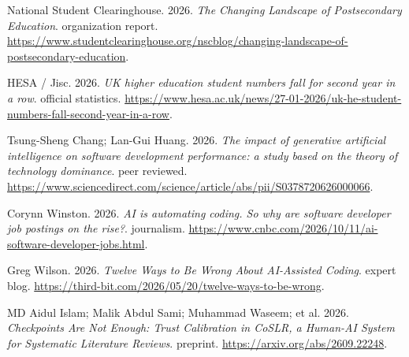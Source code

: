 {\begin{description}[leftmargin=2em,labelwidth=1.5em,itemsep=1pt,parsep=0pt]
\item[116.] \hypertarget{ref-nscc2026}{} National Student Clearinghouse. 2026. \textit{The Changing Landscape of Postsecondary Education}. organization report. \url{https://www.studentclearinghouse.org/nscblog/changing-landscape-of-postsecondary-education}.

\item[117.] \hypertarget{ref-hesa2026}{} HESA / Jisc. 2026. \textit{UK higher education student numbers fall for second year in a row}. official statistics. \url{https://www.hesa.ac.uk/news/27-01-2026/uk-he-student-numbers-fall-second-year-in-a-row}.

\item[118.] \hypertarget{ref-candidate-sciencedirect-2026}{} Tsung-Sheng Chang; Lan-Gui Huang. 2026. \textit{The impact of generative artificial intelligence on software development performance: a study based on the theory of technology dominance}. peer reviewed. \url{https://www.sciencedirect.com/science/article/abs/pii/S0378720626000066}.

\item[119.] \hypertarget{ref-candidate-cnbc-2026}{} Corynn Winston. 2026. \textit{AI is automating coding. So why are software developer job postings on the rise?}. journalism. \url{https://www.cnbc.com/2026/10/11/ai-software-developer-jobs.html}.

\item[120.] \hypertarget{ref-wilson2026}{} Greg Wilson. 2026. \textit{Twelve Ways to Be Wrong About AI-Assisted Coding}. expert blog. \url{https://third-bit.com/2026/05/20/twelve-ways-to-be-wrong}.

\item[121.] \hypertarget{ref-coslr2026}{} MD Aidul Islam; Malik Abdul Sami; Muhammad Waseem; et al. 2026. \textit{Checkpoints Are Not Enough: Trust Calibration in CoSLR, a Human-AI System for Systematic Literature Reviews}. preprint. \url{https://arxiv.org/abs/2609.22248}.
\end{description}}
